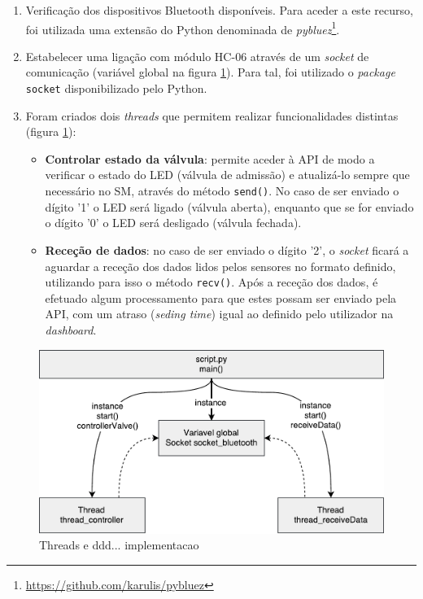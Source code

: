 \begin{enumerate}
	\item Verificação dos dispositivos Bluetooth disponíveis. Para aceder a este recurso, foi utilizada uma extensão do Python denominada de \textit{pybluez}\footnote{\url{https://github.com/karulis/pybluez}}. 
	
	
	\item Estabelecer uma ligação com módulo HC-06 através de um \textit{socket} de comunicação (variável global na figura \ref{threadscript}). Para tal, foi utilizado o \textit{package} \texttt{socket} disponibilizado pelo Python.
	
	\item Foram criados dois \textit{threads} que permitem realizar funcionalidades distintas (figura \ref{threadscript}): 
	
	\begin{itemize}
		\item \textbf{Controlar estado da válvula}: permite aceder à \ac{API} de modo a verificar o estado do \ac{LED}  (válvula de admissão) e atualizá-lo sempre que necessário no \acl{SM}, através do método \texttt{send()}. No caso de ser enviado o dígito '1' o \ac{LED} será ligado (válvula aberta), enquanto que se for enviado o dígito '0' o  \ac{LED} será desligado (válvula fechada). 
		
		\item \textbf{Receção de dados}: no caso de ser enviado o  dígito '2', o \textit{socket} ficará a aguardar a receção dos dados lidos pelos sensores no formato definido, utilizando para isso o método \texttt{recv()}. Após a receção dos dados, é efetuado algum processamento para que estes possam ser enviado pela \ac{API}, com um atraso (\textit{seding time}) igual ao definido pelo utilizador na \textit{dashboard}. 
		
		
	\end{itemize}
	
	

\end{enumerate}





\begin{figure}[h]
	\centering
	\includegraphics[width=0.6\linewidth]{esquemas/threads-python-script.pdf}
	\caption{Threads e ddd... implementacao }
	\label{threadscript}
\end{figure}





